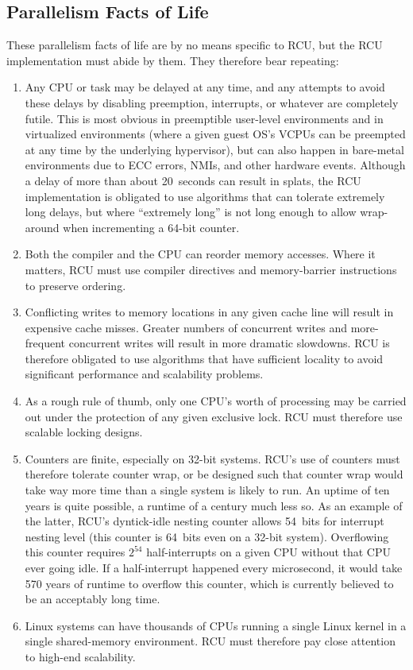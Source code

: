 \subsection{Parallelism Facts of Life}

These parallelism facts of life are by no means specific to RCU, but the
RCU implementation must abide by them.
They therefore bear repeating:

\begin{enumerate}
\item Any CPU or task may be delayed at any time, and any attempts to avoid
   these delays by disabling preemption, interrupts, or whatever are
   completely futile.
   This is most obvious in preemptible user-level
   environments and in virtualized environments (where a given guest
   OS's VCPUs can be preempted at any time by the underlying
   hypervisor), but can also happen in bare-metal environments due to
   ECC errors, NMIs, and other hardware events.
   Although a delay of more
   than about 20~seconds can result in splats, the RCU implementation is
   obligated to use algorithms that can tolerate extremely long delays,
   but where ``extremely long'' is not long enough to allow wrap-around
   when incrementing a 64-bit counter.
\item Both the compiler and the CPU can reorder memory accesses.
   Where it
   matters, RCU must use compiler directives and memory-barrier
   instructions to preserve ordering.
\item Conflicting writes to memory locations in any given cache line will
   result in expensive cache misses.
   Greater numbers of concurrent
   writes and more-frequent concurrent writes will result in more
   dramatic slowdowns.
   RCU is therefore obligated to use algorithms that
   have sufficient locality to avoid significant performance and
   scalability problems.
\item As a rough rule of thumb, only one CPU's worth of processing may be
   carried out under the protection of any given exclusive lock.
   RCU
   must therefore use scalable locking designs.
\item Counters are finite, especially on 32-bit systems.
   RCU's use of
   counters must therefore tolerate counter wrap, or be designed such
   that counter wrap would take way more time than a single system is
   likely to run.
   An uptime of ten years is quite possible, a runtime of
   a century much less so.
   As an example of the latter, RCU's
   dyntick-idle nesting counter allows 54~bits for interrupt nesting
   level (this counter is 64~bits even on a 32-bit system).
   Overflowing
   this counter requires $2^54$ half-interrupts on a given CPU
   without that CPU ever going idle.
   If a half-interrupt happened every
   microsecond, it would take 570 years of runtime to overflow this
   counter, which is currently believed to be an acceptably long time.
\item Linux systems can have thousands of CPUs running a single Linux
   kernel in a single shared-memory environment.
   RCU must therefore pay
   close attention to high-end scalability.
\end{enumerate}

